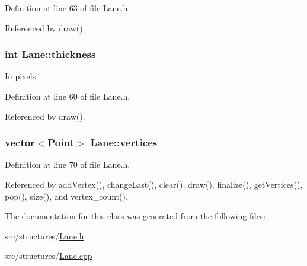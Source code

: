 \-Definition at line 63 of file \-Lane.\-h.



\-Referenced by draw().

\hypertarget{class_lane_aa614d556df980a9cf8974f77c69a1e10}{
\subsubsection[{thickness}]{\setlength{\rightskip}{0pt plus 5cm}int {\bf \-Lane\-::thickness}}}
\label{class_lane_aa614d556df980a9cf8974f77c69a1e10}
\-In pixels 

\-Definition at line 60 of file \-Lane.\-h.



\-Referenced by draw().

\hypertarget{class_lane_a77c7a2a168f611cebd7a8bccdf17dedb}{
\subsubsection[{vertices}]{\setlength{\rightskip}{0pt plus 5cm}vector$<$\-Point$>$ {\bf \-Lane\-::vertices}}}
\label{class_lane_a77c7a2a168f611cebd7a8bccdf17dedb}


\-Definition at line 70 of file \-Lane.\-h.



\-Referenced by add\-Vertex(), change\-Last(), clear(), draw(), finalize(), get\-Vertices(), pop(), size(), and vertex\-\_\-count().



\-The documentation for this class was generated from the following files\-:\begin{DoxyCompactItemize}
\item 
src/structures/\hyperlink{_lane_8h}{\-Lane.\-h}\item 
src/structures/\hyperlink{_lane_8cpp}{\-Lane.\-cpp}\end{DoxyCompactItemize}
